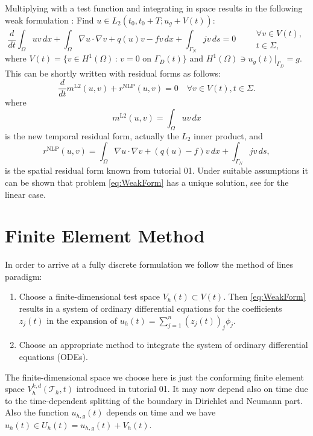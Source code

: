 \documentclass[a4paper,12pt]{article}
\begin{document}
Multiplying with a test function and integrating in space
results in the following weak formulation \cite{Ern}:
Find $u\in L_2(t_0,t_0+T;u_g+V(t))$:
\begin{equation}
\frac{d}{dt} \int_\Omega u v \,dx+ \int_\Omega \nabla u \cdot \nabla v
+ q(u) v - f v \, dx + \int_{\Gamma_N} jv \, ds = 0 \qquad
\begin{array}{l}
\forall v \in V(t),\\
t \in \Sigma,
\end{array}
\label{eq:WeakForm}
\end{equation}
where $V(t) = \{v\in H^1(\Omega)\,:\, \text{$v=0$ on $\Gamma_D(t)$}\}$
and $H^1(\Omega)\ni u_g(t)|_{\Gamma_D}=g$. This can be shortly written
with residual forms as follows: 
\begin{equation*}
\frac{d}{dt} m^{\text{L2}}(u,v) + r^{\text{NLP}}(u,v) = 0 \quad \forall v \in V(t), t \in \Sigma.
\end{equation*}
where
\begin{equation*}
m^{\text{L2}}(u,v) = \int_\Omega u v \,dx
\end{equation*}
is the new temporal residual form, actually the $L_2$ inner product, and
\begin{equation*}
r^{\text{NLP}}(u,v) = \int_\Omega \nabla u \cdot \nabla v + (q(u)-f)v\,dx + \int_{\Gamma_N} jv\,ds ,
\end{equation*}
is the spatial residual form known from tutorial 01.
Under suitable assumptions it can be shown that problem \eqref{eq:WeakForm} has
a unique solution, see \cite{Ern} for the linear case.

\section{Finite Element Method}

In order to arrive at a fully discrete formulation we follow the method of lines
paradigm:
\begin{enumerate}[1)]
\item Choose a finite-dimensional test space $V_h(t)\subset V(t)$. Then \eqref{eq:WeakForm}
results in a system of ordinary differential equations for the coefficients $z_j(t)$
in the expansion of $u_h(t)=\sum_{j=1}^n (z_j(t))_j \phi_j$.
\item Choose an appropriate method to integrate the system of ordinary differential equations (ODEs).
\end{enumerate}

The finite-dimensional space we choose here is just the conforming
finite element space $V_h^{k,d}(\mathcal{T}_h,t)$ introduced in tutorial 01.
It may now depend also on time due to the time-dependent splitting of the boundary
in Dirichlet and Neumann part. Also the function $u_{h,g}(t)$ depends on time
and we have $u_h(t)\in U_h(t) = u_{h,g}(t) + V_h(t)$.
\end{document}

